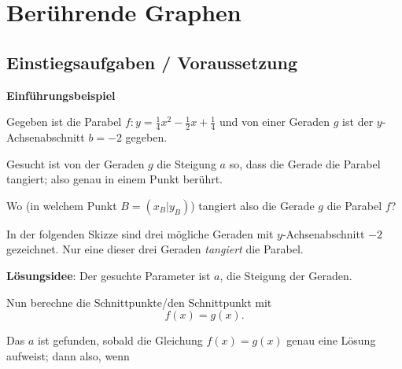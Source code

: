 \section{Berührende Graphen}


\subsection*{Einstiegsaufgaben / Voraussetzung}


\textbf{Einführungsbeispiel}


Gegeben ist die Parabel $f: y=\frac{1}{4}x^2 -\frac12x +\frac14$ und von einer
Geraden $g$ ist der $y$-Achsenabschnitt $b = -2$ gegeben.

Gesucht ist von der Geraden $g$ die Steigung $a$ so, dass die
Gerade die Parabel tangiert; also genau in einem Punkt berührt.

Wo (in welchem Punkt $B=(x_B|y_B)$) tangiert also die Gerade $g$ die Parabel $f$?

In der folgenden Skizze sind drei mögliche Geraden mit $y$-Achsenabschnitt
$-2$ gezeichnet. Nur eine dieser drei Geraden \textit{tangiert} die Parabel.

\newpage
\textbf{Lösungsidee}: Der gesuchte Parameter ist $a$, die Steigung der
Geraden.

Nun berechne die Schnittpunkte/den Schnittpunkt mit $$f(x) = g(x).$$

Das $a$ ist gefunden, sobald die Gleichung $f(x)=g(x)$ genau eine
Lösung aufweist; dann also, wenn



